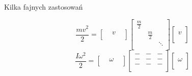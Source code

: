 \documentclass[../main.tex]{subfiles}
\begin{document}
\begin{large}
    Kilka fajnych zastosowań
\end{large}
$$\frac{mv^2}{2} =
\left [ \begin{matrix}
 &v &\\ \end{matrix}\right ]
\left [ \begin{matrix}
    \frac{m}{2}\\
&\frac{m}{2}\\
   & & \ddots\\
    \end{matrix}\right ]  \left [ \begin{matrix}
\\
v\\
 \\\end{matrix}\right ]$$
 $$\frac{I \omega^2}{2} =
 \left [ \begin{matrix}
 &\omega &
 \\ \end{matrix}\right ]
 \left [ \begin{matrix}
 - &- &-\\
 - &- &-\\
 - &- &-\\
     \end{matrix}\right ] \left [ \begin{matrix}
 \\
 \omega\\
 \\
 \end{matrix}\right ] $$
\end{document}
